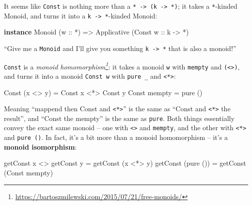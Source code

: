 \documentclass[]{article}
\newenvironment{Shaded}{}{}
\newcommand{\DataTypeTok}[1]{\textcolor[rgb]{0.56,0.13,0.00}{#1}}
\newcommand{\FunctionTok}[1]{\textcolor[rgb]{0.02,0.16,0.49}{#1}}
\newcommand{\KeywordTok}[1]{\textcolor[rgb]{0.00,0.44,0.13}{\textbf{#1}}}
\newcommand{\NormalTok}[1]{#1}
\newcommand{\OtherTok}[1]{\textcolor[rgb]{0.00,0.44,0.13}{#1}}
\renewcommand{\href}[2]{#2\footnote{\url{#1}}}
\begin{document}
It seems like \texttt{Const} is nothing more than a
\texttt{*\ -\textgreater{}\ (k\ -\textgreater{}\ *)}; it takes a
\texttt{*}-kinded Monoid, and turns it into a
\texttt{k\ -\textgreater{}\ *}-kinded Monoid:

\begin{Shaded}
\begin{Highlighting}[]
\KeywordTok{instance} \DataTypeTok{Monoid}\NormalTok{ (}\OtherTok{w ::} \FunctionTok{*}\NormalTok{) }\OtherTok{=>} \DataTypeTok{Applicative}\NormalTok{ (}\DataTypeTok{Const}\OtherTok{ w ::}\NormalTok{ k }\OtherTok{->} \FunctionTok{*}\NormalTok{)}
\end{Highlighting}
\end{Shaded}

``Give me a \texttt{Monoid} and I'll give you something
\texttt{k\ -\textgreater{}\ *} that is also a monoid!''

\texttt{Const} is a
\emph{\href{https://bartoszmilewski.com/2015/07/21/free-monoids/}{monoid
homomorphism}}: it takes a monoid \texttt{w} with \texttt{mempty} and
\texttt{(\textless{}\textgreater{})}, and turns it into a monoid
\texttt{Const\ w} with \texttt{pure\ \_} and
\texttt{\textless{}*\textgreater{}}:

\begin{Shaded}
\begin{Highlighting}[]
\DataTypeTok{Const}\NormalTok{ (x }\FunctionTok{<>}\NormalTok{ y) }\FunctionTok{=} \DataTypeTok{Const}\NormalTok{ x }\FunctionTok{<*>} \DataTypeTok{Const}\NormalTok{ y}
\DataTypeTok{Const}\NormalTok{ mempty   }\FunctionTok{=}\NormalTok{ pure ()}
\end{Highlighting}
\end{Shaded}

Meaning ``mappend then Const and \texttt{\textless{}*\textgreater{}}'' is the
same as ``Const and \texttt{\textless{}*\textgreater{}} the result'', and
``Const the mempty'' is the same as \texttt{pure}. Both things essentially
convey the exact same monoid -- one with \texttt{\textless{}\textgreater{}} and
\texttt{mempty}, and the other with \texttt{\textless{}*\textgreater{}} and
\texttt{pure\ ()}. In fact, it's a bit more than a monoid homomorphism -- it's a
\textbf{monoid isomorphism}:

\begin{Shaded}
\begin{Highlighting}[]
\NormalTok{getConst x }\FunctionTok{<>}\NormalTok{ getConst y }\FunctionTok{=}\NormalTok{ getConst (x }\FunctionTok{<*>}\NormalTok{ y)}
\NormalTok{getConst (pure ())       }\FunctionTok{=}\NormalTok{ getConst (}\DataTypeTok{Const}\NormalTok{ mempty)}
\end{Highlighting}
\end{Shaded}
\end{document}
